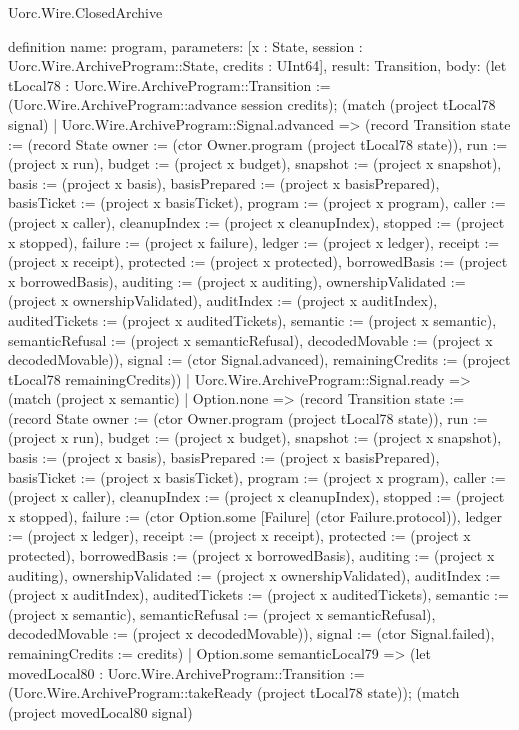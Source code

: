 \begin{lexlean}{Uorc.Wire.ClosedArchive}
\begin{semanticmodule}
definition{
  name: program,
  parameters: [x : State, session : Uorc.Wire.ArchiveProgram::State, credits : UInt64],
  result: Transition,
  body: (let tLocal78 : Uorc.Wire.ArchiveProgram::Transition := (Uorc.Wire.ArchiveProgram::advance session credits); (match (project tLocal78 signal)
    | Uorc.Wire.ArchiveProgram::Signal.advanced => (record Transition {state := (record State {owner := (ctor Owner.program (project tLocal78 state)), run := (project x run), budget := (project x budget), snapshot := (project x snapshot), basis := (project x basis), basisPrepared := (project x basisPrepared), basisTicket := (project x basisTicket), program := (project x program), caller := (project x caller), cleanupIndex := (project x cleanupIndex), stopped := (project x stopped), failure := (project x failure), ledger := (project x ledger), receipt := (project x receipt), protected := (project x protected), borrowedBasis := (project x borrowedBasis), auditing := (project x auditing), ownershipValidated := (project x ownershipValidated), auditIndex := (project x auditIndex), auditedTickets := (project x auditedTickets), semantic := (project x semantic), semanticRefusal := (project x semanticRefusal), decodedMovable := (project x decodedMovable)}), signal := (ctor Signal.advanced), remainingCredits := (project tLocal78 remainingCredits)})
    | Uorc.Wire.ArchiveProgram::Signal.ready => (match (project x semantic)
      | Option.none => (record Transition {state := (record State {owner := (ctor Owner.program (project tLocal78 state)), run := (project x run), budget := (project x budget), snapshot := (project x snapshot), basis := (project x basis), basisPrepared := (project x basisPrepared), basisTicket := (project x basisTicket), program := (project x program), caller := (project x caller), cleanupIndex := (project x cleanupIndex), stopped := (project x stopped), failure := (ctor Option.some [Failure] (ctor Failure.protocol)), ledger := (project x ledger), receipt := (project x receipt), protected := (project x protected), borrowedBasis := (project x borrowedBasis), auditing := (project x auditing), ownershipValidated := (project x ownershipValidated), auditIndex := (project x auditIndex), auditedTickets := (project x auditedTickets), semantic := (project x semantic), semanticRefusal := (project x semanticRefusal), decodedMovable := (project x decodedMovable)}), signal := (ctor Signal.failed), remainingCredits := credits})
      | Option.some semanticLocal79 => (let movedLocal80 : Uorc.Wire.ArchiveProgram::Transition := (Uorc.Wire.ArchiveProgram::takeReady (project tLocal78 state)); (match (project movedLocal80 signal)
}
\end{semanticmodule}
\end{lexlean}
